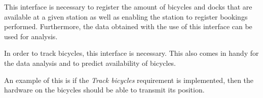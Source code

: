\begin{description}[style=nextline]
	\item[Interface between station and server] This interface is necessary to register the amount of bicycles and docks that are available at a given station as well as enabling the station to register bookings performed. Furthermore, the data obtained with the use of this interface can be used for analysis.
	\item[Interface between bicycle and server] In order to track bicycles, this interface is necessary. This also comes in handy for the data analysis and to predict availability of bicycles.
\end{description}

An example of this is if the \textit{Track bicycles} requirement is implemented, then the hardware on the bicycles should be able to transmit its position.